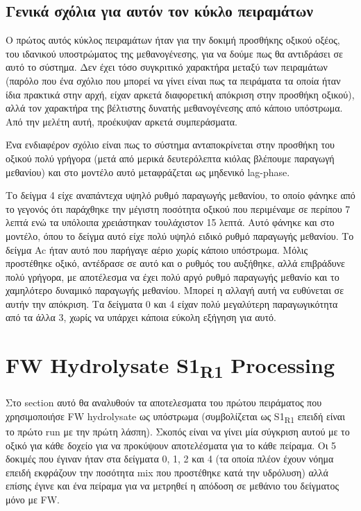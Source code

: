 \documentclass[11pt]{article}
\begin{document}
\subsection{Γενικά σχόλια για αυτόν τον κύκλο πειραμάτων}
\label{sec:orgde5376e}
Ο πρώτος αυτός κύκλος πειραμάτων ήταν για την δοκιμή προσθήκης οξικού οξέος, του ιδανικού υποστρώματος της μεθανογένεσης, για να δούμε πως θα αντιδράσει σε αυτό το σύστημα. Δεν έχει τόσο συγκριτικό χαρακτήρα μεταξύ των πειραμάτων (παρόλο που ένα σχόλιο που μπορεί να γίνει είναι πως τα πειράματα τα οποία ήταν ίδια πρακτικά στην αρχή, είχαν αρκετά διαφορετική απόκριση στην προσθήκη οξικού), αλλά τον χαρακτήρα της βέλτιστης δυνατής μεθανογένεσης από κάποιο υπόστρωμα. Από την μελέτη αυτή, προέκυψαν αρκετά συμπεράσματα.

Ένα ενδιαφέρον σχόλιο είναι πως το σύστημα ανταποκρίνεται στην προσθήκη του οξικού πολύ γρήγορα (μετά από μερικά δευτερόλεπτα κιόλας βλέπουμε παραγωγή μεθανίου) και στο μοντέλο αυτό μεταφράζεται ως μηδενικό lag-phase.

Το δείγμα 4 είχε αναπάντεχα υψηλό ρυθμό παραγωγής μεθανίου, το οποίο φάνηκε από το γεγονός ότι παράχθηκε την μέγιστη ποσότητα οξικού που περιμέναμε σε περίπου 7 λεπτά ενώ τα υπόλοιπα χρειάστηκαν τουλάχιστον 15 λεπτά. Αυτό φάνηκε και στο μοντέλο, όπου το δείγμα αυτό είχε πολύ υψηλό ειδικό ρυθμό παραγωγής μεθανίου. Το δείγμα Ac ήταν αυτό που παρήγαγε αέριο χωρίς κάποιο υπόστρωμα. Μόλις προστέθηκε οξικό, αντέδρασε σε αυτό και ο ρυθμός του αυξήθηκε, αλλά επιβράδυνε πολύ γρήγορα, με αποτέλεσμα να έχει πολύ αργό ρυθμό παραγωγής μεθανίο και το χαμηλότερο δυναμικό παραγωγής μεθανίου. Μπορεί η αλλαγή αυτή να ευθύνεται σε αυτήν την απόκριση. Τα δείγματα 0 και 4 είχαν πολύ μεγαλύτερη παραγωγικότητα από τα άλλα 3, χωρίς να υπάρχει κάποια εύκολη εξήγηση για αυτό.

\pagebreak

\section{FW Hydrolysate S1\textsubscript{R1} Processing}
\label{sec:org350c8c7}
Στο section αυτό θα αναλυθούν τα αποτελεσματα του πρώτου πειράματος που χρησιμοποιήσε FW hydrolysate ως υπόστρωμα (συμβολίζεται ως S1\textsubscript{R1} επειδή είναι το πρώτο run με την πρώτη λάσπη). Σκοπός είναι να γίνει μία σύγκριση αυτού με το οξικό για κάθε δοχείο για να προκύψουν αποτελέσματα για το κάθε πείραμα. Οι 5 δοκιμές που έγιναν ήταν στα δείγματα 0, 1, 2 και 4 (τα οποία πλέον έχουν νόημα επειδή εκφράζουν την ποσότητα mix που προστέθηκε κατά την υδρόλυση) αλλά επίσης έγινε και ένα πείραμα για να μετρηθεί η απόδοση σε μεθάνιο του δείγματος μόνο με FW.
\end{document}
